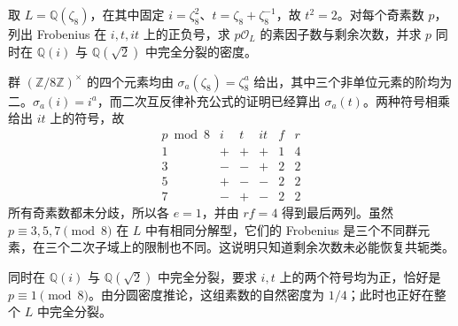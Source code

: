 \begin{exercise}\label{b3:ex:A-cyclotomic-eight-quadratic-signs}
	取 \(L=\mathbb Q(\zeta_8)\)，在其中固定 \(i=\zeta_8^2\)、\(t=\zeta_8+\zeta_8^{-1}\)，故 \(t^2=2\)。对每个奇素数 \(p\)，列出 Frobenius 在 \(i,t,it\) 上的正负号，求 \(p\mathcal O_L\) 的素因子数与剩余次数，并求 \(p\) 同时在 \(\mathbb Q(i)\) 与 \(\mathbb Q(\sqrt2)\) 中完全分裂的密度。
\end{exercise}
\begin{solution}
	群 \((\mathbb Z/8\mathbb Z)^\times\) 的四个元素均由 \(\sigma_a(\zeta_8)=\zeta_8^a\) 给出，其中三个非单位元素的阶均为二。\(\sigma_a(i)=i^a\)，而二次互反律补充公式的证明已经算出 \(\sigma_a(t)\)。两种符号相乘给出 \(it\) 上的符号，故
	\[
		\begin{array}{c|ccc|cc}
			p\bmod8&i&t&it&f&r\\\hline
			1&+&+&+&1&4\\
			3&-&-&+&2&2\\
			5&+&-&-&2&2\\
			7&-&+&-&2&2
		\end{array}
	\]
	所有奇素数都未分歧，所以各 \(e=1\)，并由 \(rf=4\) 得到最后两列。虽然 \(p\equiv3,5,7\pmod8\) 在 \(L\) 中有相同分解型，它们的 Frobenius 是三个不同群元素，在三个二次子域上的限制也不同。这说明只知道剩余次数未必能恢复共轭类。

	同时在 \(\mathbb Q(i)\) 与 \(\mathbb Q(\sqrt2)\) 中完全分裂，要求 \(i,t\) 上的两个符号均为正，恰好是 \(p\equiv1\pmod8\)。由分圆密度推论，这组素数的自然密度为 \(1/4\)；此时也正好在整个 \(L\) 中完全分裂。
\end{solution}

